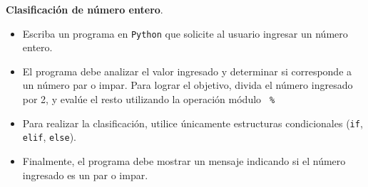 \item \textbf{Clasificación de número entero}.

\begin{tcolorbox}[colback=blue!2!white,colframe=blue!55!black,title={Enunciado}]
\begin{itemize}
	\item Escriba un programa en \texttt{Python} que solicite al usuario ingresar un número entero.
	\item El programa debe analizar el valor ingresado y determinar si corresponde a un número par o impar. Para lograr el objetivo, divida el número ingresado por 2, y evalúe el resto utilizando la operación módulo \texttt{ \% }
\item Para realizar la clasificación, utilice únicamente estructuras condicionales (\texttt{if}, \texttt{elif}, \texttt{else}).
\item Finalmente, el programa debe mostrar un mensaje indicando si el número ingresado es un par o impar.
\end{itemize}
\end{tcolorbox}

